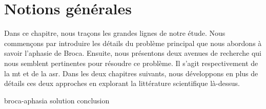 \chapter{Notions générales}
\label{chap.general-notions}

Dans ce chapitre, nous traçons les grandes lignes de notre étude.
Nous commençons par introduire les détails du problème principal que nous abordons à savoir l'aphasie de Broca.
Ensuite, nous présentons deux avenues de recherche qui nous semblent pertinentes pour résoudre ce problème.
Il s'agit respectivement de la \gls{mt} et de la \gls{asr}.
Dans les deux chapitres suivants, 
nous développons en plus de détails ces deux approches
en explorant la littérature scientifique là-dessus.

{broca-aphasia}
{solution}
\pagebreak
{conclusion}